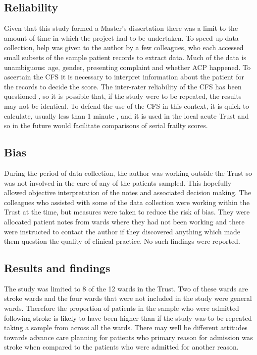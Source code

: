 \documentclass
[
	12pt,
	a4paper,
	oneside,
]{report}
\begin{document}
\subsection{Reliability} 

Given that this study formed a Master's dissertation there was a limit to the
amount of time in which the project had to be undertaken. To speed up data 
collection, help was given to the author by a few
colleagues, who each accessed small subsets of the sample patient records to 
extract data. Much of the data is unambiguous: age, gender, presenting complaint
and whether ACP happened. To ascertain the CFS it is necessary to interpret 
information about the patient for the records to decide the score. The
inter-rater reliability of the CFS has been questioned \parencite{gilbert:18},
so it is possible that, 
if the study were to be repeated, the results may not be identical.
To defend the use of the CFS in this context, it is quick to calculate, usually 
less than 1 minute \parencite{elliott:17}, and it is used in the local acute
Trust and so in the future would facilitate comparisons of serial frailty
scores.

\subsection{Bias} 
During the period of data collection, the author was working outside the Trust 
so was not involved in the care of any of the patients sampled. This hopefully 
allowed objective interpretation of the notes and associated decision making.
The colleagues who assisted with some of the data collection were working 
within the Trust at the time, but measures were taken to reduce the risk of 
bias. They were allocated patient notes from wards where they had not been
working and there were instructed to contact the author if they discovered
anything which made them question the quality of clinical practice. No such
findings were reported.

\subsection{Results and findings}

The study was limited to 8 of the 12 wards in the Trust. Two of these wards
are stroke wards and the four wards that were not included in the study were 
general wards. Therefore the proportion of patients in the sample
who were admitted following stroke is likely to have been higher than if the 
study was to be repeated taking a sample from across all the wards. There may 
well be different attitudes towards advance care planning for patients who 
primary reason for admission was stroke when compared to the patients who
were admitted for another reason.
\end{document}
